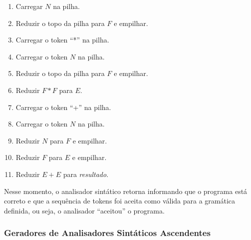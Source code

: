 \begin{enumerate}
  \item Carregar $N$ na pilha.
  \item Reduzir o topo da pilha para $F$ e empilhar.
  \item Carregar o token ``*'' na pilha.
  \item Carregar o token $N$ na pilha.
  \item Reduzir o topo da pilha para $F$ e empilhar.
  \item Reduzir $F*F$ para $E$.
  \item Carregar o token ``+'' na pilha.
  \item Carregar o token $N$ na pilha.
  \item Reduzir $N$ para $F$ e empilhar.
  \item Reduzir $F$ para $E$ e empilhar.
  \item Reduzir $E+E$ para \emph{resultado}.
\end{enumerate}

Nesse momento, o analisador sintático retorna informando que o programa está
correto e que a sequência de tokens foi aceita como válida para a gramática
definida, ou seja, o analisador ``aceitou'' o programa.

\subsubsection{Geradores de Analisadores Sintáticos Ascendentes}
\label{sec:yacc}

